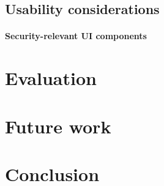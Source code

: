 \documentclass[12pt,a4paper,notitlepage]{article}
\begin{document}
\subsection{Usability considerations}
\paragraph{Security-relevant UI components}

\section{Evaluation}

\section{Future work}

\section{Conclusion}


%

\end{document}
